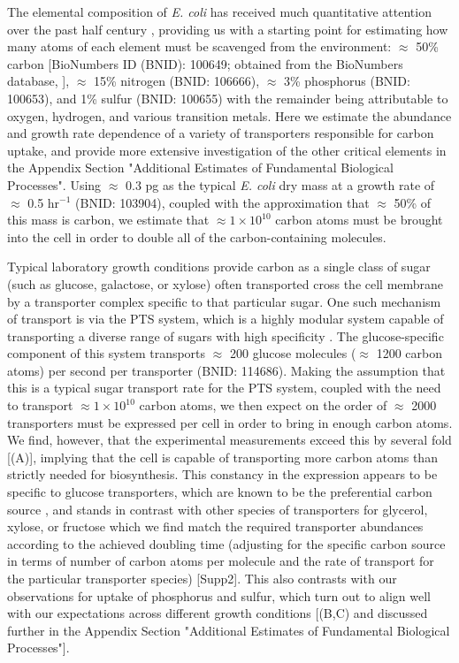 The elemental composition of \textit{E. coli} has received much quantitative
attention over the past half century \citep{neidhardt1991, taymaz-nikerel2010,
heldal1985, bauer1976}, providing us with a starting point for estimating how
many atoms of each element must be scavenged from the environment: $\approx$
50\% carbon [BioNumbers ID (BNID): 100649; obtained from the BioNumbers database,
\cite{milo2010}], $\approx$ 15\% nitrogen (BNID: 106666), $\approx$ 3\% phosphorus
(BNID: 100653), and 1\% sulfur (BNID: 100655) with the remainder being
attributable to oxygen, hydrogen, and various transition metals.  Here we
estimate the abundance and growth rate dependence of a variety of transporters
responsible for carbon uptake, and provide more extensive investigation of the
other critical elements in the Appendix
Section "Additional Estimates of Fundamental Biological Processes". Using
$\approx$ 0.3 pg as the typical \textit{E. coli} dry mass at a growth rate of
$\approx$ 0.5 hr$^{-1}$ (BNID: 103904), coupled with the approximation that
$\approx$ 50\% of this mass is carbon, we estimate that $\approx 1\times
10^{10}$ carbon atoms must be brought into the cell in order to double all of
the carbon-containing molecules.

Typical laboratory growth conditions provide carbon as a single class of sugar
(such as glucose, galactose, or xylose) often transported cross the cell
membrane by a transporter complex specific to that particular sugar. One such
mechanism of transport is via the PTS system, which is a highly modular system
capable of transporting a diverse range of sugars with high specificity
\citep{escalante2012}. The glucose-specific component of this system transports
$\approx$ 200 glucose molecules ($\approx$ 1200 carbon atoms) per second per
transporter (BNID: 114686). Making the assumption that this is a typical sugar
transport rate for the PTS system, coupled with the need to transport $\approx 1
\times 10^{10}$ carbon atoms, we then expect on the order of $\approx$ 2000
transporters must be expressed per cell in order to bring in enough carbon atoms.
We find, however, that the experimental
measurements exceed this by several fold [(A)],
implying that the cell is capable of transporting more carbon atoms than
strictly needed for biosynthesis. This constancy in the expression appears to be
specific to glucose transporters, which are known to be the
preferential carbon source \citep{monod1947, liu2005a, aidelberg2014}, and
stands in contrast with other species of transporters for glycerol, xylose, or
fructose which we find match the required transporter abundances according to
the achieved doubling time (adjusting for the specific carbon source in terms of
number of carbon atoms per molecule and the rate of transport for the particular
transporter species) [Supp2]. This also contrasts with our observations for
uptake of phosphorus and sulfur, which turn out to align well with our
expectations across different growth conditions
[(B,C) and discussed further in the Appendix
Section "Additional Estimates of Fundamental Biological Processes"].

